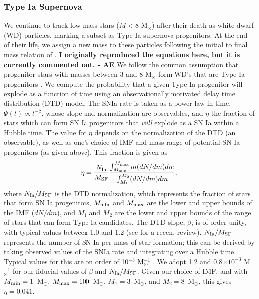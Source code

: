 \documentclass[twocolumn]{aastex61}
\begin{document}
\subsubsection{Type Ia Supernova}
\label{sec:Type Ia}
We continue to track low mass stars ($M < 8$ M$_{\odot}$) after their death as white dwarf (WD) particles, marking a subset as Type Ia supernova progenitors. At the end of their life, we assign a new mass to these particles following the initial to final mass relation of \citet{Salaris2009}. \textbf{I originally reproduced the equations here, but it is currently commented out. - AE}
We follow the common assumption that progenitor stars with masses between 3 and 8 M$_{\odot}$ form WD's that are Type Ia progenitors \citep[see][ and references therein]{Cote2017}. We compute the probability that a given Type Ia progenitor will explode as a function of time using an observationally motivated delay time distribution (DTD) model. 
The SNIa rate is taken as a power law in time, $\Psi (t) \propto t^{-\beta}$, whose slope and normalization are observables, and $\eta$ the fraction of stars which can form SN Ia progenitors that \textit{will} explode as a SN Ia within a Hubble time. The value for $\eta$ depends on the normalization of the DTD (an observable), as well as one's choice of IMF and mass range of potential SN Ia progenitors (as given above). This fraction is given as
\begin{equation}
\eta = \frac{N_{\rm Ia}}{M_{\rm SF}} \frac{\int_{M_{\rm min}}^{M_{\rm max}} m (dN/dm) dm }{\int_{M_{1}}^{M_{2}} (dN/dm) dm},
\end{equation}
where $N_{\rm Ia}/M_{\rm SF}$ is the DTD normalization, which represents the fraction of stars that form SN Ia progenitors, $M_{\rm min}$ and $M_{\rm max}$ are the lower and upper bounds of the IMF ($dN/dm$), and $M_{1}$ and $M_{2}$ are the lower and upper bounds of the range of stars that can form Type Ia candidates. The DTD slope, $\beta$, is of order unity, with typical values between 1.0 and 1.2 (see \citet{Maoz2014} for a recent review). $N_{\rm Ia}/M_{\rm SF}$ represents the number of SN Ia per mass of star formation; this can be derived by taking observed values of the SNIa rate and integrating over a Hubble time. Typical values for this are on order of 10$^{-3}$ M$_{\odot}^{-1}$ \citep{Maoz2014}. We adopt 1.2 \citet{Maoz2010} and 0.8$\times 10^{-3}$ M$_{\odot}^{-1}$ \citet{GraurMaoz2013} for our fiducial values of $\beta$ and $N_{\rm Ia}/M_{\rm SF}$. Given our choice of IMF, and with $M_{\rm min} = 1$~M$_{\odot}$, $M_{\rm max}=100$~M$_{\odot}$, $M_{1}=3$~M$_{\odot}$, and $M_{2}=8$~M$_{\odot}$, this gives $\eta = 0.041$.
\end{document}
